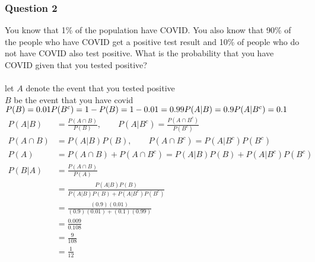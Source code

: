 \documentclass[12pt, border = 4pt, multi]{article} %
\begin{document}
\subsubsection*{Question 2}
You know that 1\% of the 
population have COVID. You also 
know that 90\% of the people who 
have COVID get a positive test result
and 10\% of people who do not 
have COVID also test positive.
What is the probability that you 
have COVID given that you 
tested positive?\\
\\
let $A$ denote the event that you tested positive\\
$B$ be the event that you have covid\\
$P(B) = 0.01\\
P(B ^ c) = 1 - P(B) = 1 - 0.01 = 0.99\\
P(A | B) = 0.9\\
P(A | B ^ c) = 0.1$
\begin{align*}
P(A | B) &= \frac{P(A \cap B)}{P(B)}, \qquad P(A | B ^ c) = \frac{P(A \cap B ^ c)}{P(B ^ c)}\\
P(A \cap B) &= P(A | B)P(B), \qquad P(A \cap B ^ c) = P(A | B ^ c)P(B ^ c)\\
P(A) &= P(A \cap B) + P(A \cap B ^ c) = P(A | B)P(B) + P(A | B ^ c)P(B ^ c)\\
P(B | A) &= \frac{P(A \cap B)}{P(A)}\\
&= \frac{P(A | B)P(B)}{P(A | B)P(B) + P(A | B ^ c)P(B ^ c)}\\
&= \frac{(0.9)(0.01)}{(0.9)(0.01) + (0.1)(0.99)}\\
&= \frac{0.009}{0.108}\\
&= \frac{9}{108}\\
&= \boxed{\frac{1}{12}}
\end{align*}
\newpage
\noindent
\end{document}

